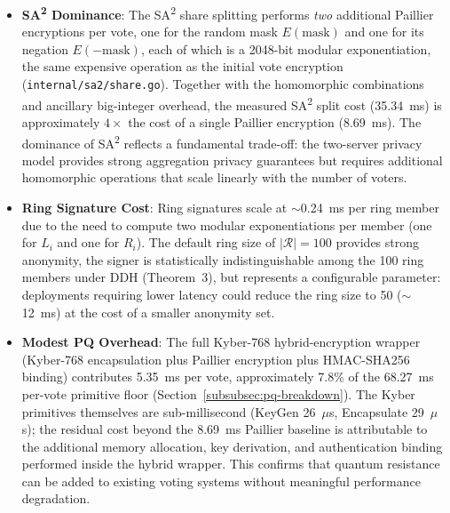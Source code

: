 \begin{itemize}
    \item \textbf{SA\textsuperscript{2} Dominance}: The SA\textsuperscript{2} share splitting performs \emph{two} additional Paillier encryptions per vote, one for the random mask $E(\text{mask})$ and one for its negation $E(-\text{mask})$, each of which is a 2048-bit modular exponentiation, the same expensive operation as the initial vote encryption (\texttt{internal/sa2/share.go}). Together with the homomorphic combinations and ancillary big-integer overhead, the measured SA\textsuperscript{2} split cost (35.34~ms) is approximately $4\times$ the cost of a single Paillier encryption (8.69~ms). The dominance of SA\textsuperscript{2} reflects a fundamental trade-off: the two-server privacy model provides strong aggregation privacy guarantees but requires additional homomorphic operations that scale linearly with the number of voters.
    
    \item \textbf{Ring Signature Cost}: Ring signatures scale at $\sim$0.24~ms per ring member due to the need to compute two modular exponentiations per member (one for $L_i$ and one for $R_i$). The default ring size of $|\mathcal{R}|=100$ provides strong anonymity, the signer is statistically indistinguishable among the 100 ring members under DDH (Theorem~3), but represents a configurable parameter: deployments requiring lower latency could reduce the ring size to 50 ($\sim$12~ms) at the cost of a smaller anonymity set.
    
    \item \textbf{Modest PQ Overhead}: The full Kyber-768 hybrid-encryption wrapper (Kyber-768 encapsulation plus Paillier encryption plus HMAC-SHA256 binding) contributes 5.35~ms per vote, approximately 7.8\% of the 68.27~ms per-vote primitive floor (Section~\ref{subsubsec:pq-breakdown}). The Kyber primitives themselves are sub-millisecond (KeyGen 26~$\mu$s, Encapsulate 29~$\mu$s); the residual cost beyond the 8.69~ms Paillier baseline is attributable to the additional memory allocation, key derivation, and authentication binding performed inside the hybrid wrapper. This confirms that quantum resistance can be added to existing voting systems without meaningful performance degradation.
\end{itemize}

